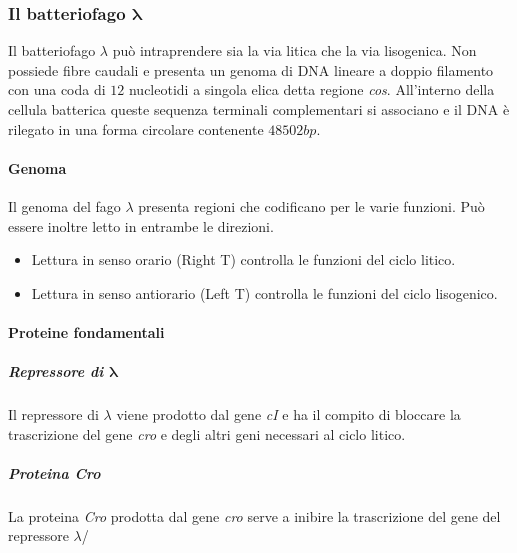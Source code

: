 		\subsubsection{Il batteriofago $\mathbf{\lambda}$}
		Il batteriofago $\lambda$ può intraprendere sia la via litica che la via lisogenica. 
		Non possiede fibre caudali e presenta un genoma di DNA lineare a doppio filamento con una coda di $12$ nucleotidi a singola elica detta regione \emph{cos}. 
		All'interno della cellula batterica queste sequenza terminali complementari si associano e il DNA è rilegato in una forma circolare contenente $48502 bp$.

			\paragraph{Genoma}
			Il genoma del fago $\lambda$ presenta regioni che codificano per le varie funzioni.
			Pu\`o essere inoltre letto in entrambe le direzioni.
			\begin{multicols}{2}
    				\begin{itemize}
        				\item Lettura in senso orario (Right T) controlla le funzioni del ciclo litico.
        				\item Lettura in senso antiorario (Left T) controlla le funzioni del ciclo lisogenico.
    				\end{itemize}
			\end{multicols}

			\paragraph{Proteine fondamentali}

				\subparagraph{Repressore di $\mathbf{\lambda}$}
				Il repressore di $\lambda$ viene prodotto dal gene \emph{cI} e ha il compito di bloccare la trascrizione del gene \emph{cro} e degli altri geni necessari al ciclo litico.

				\subparagraph{Proteina \emph{Cro}}
				La proteina \emph{Cro} prodotta dal gene \emph{cro} serve a inibire la trascrizione del gene del repressore $\lambda$/
			
